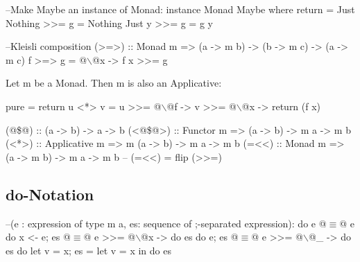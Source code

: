 \begin{Haskell}
--Make Maybe an instance of Monad:
instance Monad Maybe where
   return = Just
   Nothing >>= g = Nothing
   Just y >>= g = g y

--Kleisli composition
(>=>) :: Monad m => (a -> m b) -> (b -> m c) -> (a -> m c)
f >=> g = @$\backslash$@x -> f x >>= g
\end{Haskell}

Let m be a Monad. Then m is also an Applicative:

\begin{Haskell}
pure = return
u <*> v = u >>= @$\backslash$@f -> v >>= @$\backslash$@x -> return (f x)
\end{Haskell}

\begin{Haskell}
(@\$@) :: (a -> b) -> a -> b
(<@\$@>) :: Functor m => (a -> b) -> m a -> m b
(<*>) :: Applicative m => m (a -> b) -> m a -> m b
(=<<) :: Monad m => (a -> m b) -> m a -> m b -- (=<<) = flip (>>=)
\end{Haskell}

\subsection{do-Notation}
\begin{Haskell}
--(e : expression of type m a, es: sequence of ;-separated expression):
do { e } @$\equiv$@ e
do {x <- e; es} @$\equiv$@ e >>= @$\backslash$@x -> do {es}
do {e; es} @$\equiv$@ e >>= @$\backslash$@_ -> do {es}
do {let v = x; es} = let v = x in do {es}
\end{Haskell}